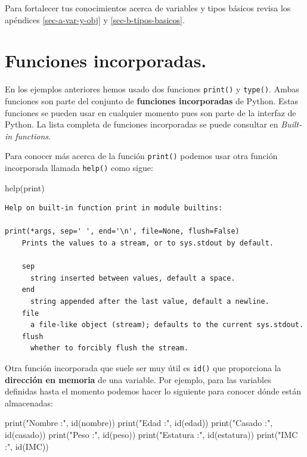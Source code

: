 \documentclass[
  spanish,
  letterpaper,
]{scrbook}
\newenvironment{Shaded}{\begin{snugshade}}{\end{snugshade}}
\newcommand{\BuiltInTok}[1]{\textcolor[rgb]{0.00,0.23,0.31}{#1}}
\newcommand{\NormalTok}[1]{\textcolor[rgb]{0.00,0.23,0.31}{#1}}
\newcommand{\StringTok}[1]{\textcolor[rgb]{0.13,0.47,0.30}{#1}}
\theoremstyle{definition}
\theoremstyle{remark}
\begin{document}
Para fortalecer tus conocimientos acerca de variables y tipos básicos
revisa los apéndices \ref{sec-a-var-y-obj} y \ref{sec-b-tipos-basicos}.

\section{Funciones incorporadas.}\label{sec-l1-funciones-incorporadas}

En los ejemplos anteriores hemos usado dos funciones \texttt{print()} y
\texttt{type()}. Ambas funciones son parte del conjunto de
\textbf{funciones incorporadas} de Python. Estas funciones se pueden
usar en cualquier momento pues son parte de la interfaz de Python. La
lista completa de funciones incorporadas se puede consultar en
\emph{Built-in functions}.

Para conocer más acerca de la función \texttt{print()} podemos usar otra
función incorporada llamada \texttt{help()} como sigue:

\begin{Shaded}
\begin{Highlighting}[]
\BuiltInTok{help}\NormalTok{(}\BuiltInTok{print}\NormalTok{)}
\end{Highlighting}
\end{Shaded}

\begin{verbatim}
Help on built-in function print in module builtins:

print(*args, sep=' ', end='\n', file=None, flush=False)
    Prints the values to a stream, or to sys.stdout by default.

    sep
      string inserted between values, default a space.
    end
      string appended after the last value, default a newline.
    file
      a file-like object (stream); defaults to the current sys.stdout.
    flush
      whether to forcibly flush the stream.
\end{verbatim}

Otra función incorporada que suele ser muy útil es \texttt{id()} que
proporciona la \textbf{dirección en memoria} de una variable. Por
ejemplo, para las variables definidas hasta el momento podemos hacer lo
siguiente para conocer dónde están almacenadas:

\begin{Shaded}
\begin{Highlighting}[]
\BuiltInTok{print}\NormalTok{(}\StringTok{"Nombre :"}\NormalTok{, }\BuiltInTok{id}\NormalTok{(nombre))}
\BuiltInTok{print}\NormalTok{(}\StringTok{"Edad :"}\NormalTok{, }\BuiltInTok{id}\NormalTok{(edad))}
\BuiltInTok{print}\NormalTok{(}\StringTok{"Casado :"}\NormalTok{, }\BuiltInTok{id}\NormalTok{(casado))}
\BuiltInTok{print}\NormalTok{(}\StringTok{"Peso :"}\NormalTok{, }\BuiltInTok{id}\NormalTok{(peso))}
\BuiltInTok{print}\NormalTok{(}\StringTok{"Estatura :"}\NormalTok{, }\BuiltInTok{id}\NormalTok{(estatura))}
\BuiltInTok{print}\NormalTok{(}\StringTok{"IMC :"}\NormalTok{, }\BuiltInTok{id}\NormalTok{(IMC))}
\end{Highlighting}
\end{Shaded}
\end{document}
